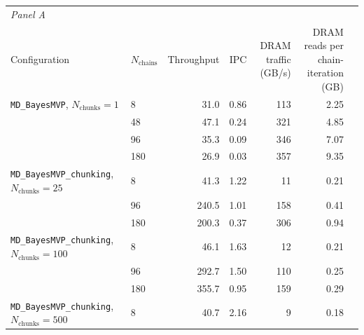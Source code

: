 \begin{table}[H]
{%
\begin{tabular}{llrrrrr}
\hline
\multicolumn{7}{l}{\textit{Panel A}} \\
Configuration & $N_{\text{chains}}$ & Throughput & IPC & \makecell[r]{DRAM traffic \\ (GB/s)} & \makecell[r]{DRAM reads per \\ chain-iteration (GB)} & \\
\hline
\texttt{MD\_BayesMVP}, $N_{\text{chunks}} = 1$ & 8 & 31.0 & 0.86 & 113 & 2.25 & \\
 & 48 & 47.1 & 0.24 & 321 & 4.85 & \\
 & 96 & 35.3 & 0.09 & 346 & 7.07 & \\
 & 180 & 26.9 & 0.03 & 357 & 9.35 & \\
\texttt{MD\_BayesMVP\_chunking}, $N_{\text{chunks}} = 25$ & 8 & 41.3 & 1.22 & 11 & 0.21 & \\
 & 96 & 240.5 & 1.01 & 158 & 0.41 & \\
 & 180 & 200.3 & 0.37 & 306 & 0.94 & \\
\texttt{MD\_BayesMVP\_chunking}, $N_{\text{chunks}} = 100$ & 8 & 46.1 & 1.63 & 12 & 0.21 & \\
 & 96 & 292.7 & 1.50 & 110 & 0.25 & \\
 & 180 & 355.7 & 0.95 & 159 & 0.29 & \\
\texttt{MD\_BayesMVP\_chunking}, $N_{\text{chunks}} = 500$ & 8 & 40.7 & 2.16 & 9 & 0.18 & \\

\end{tabular}}
\end{table}
